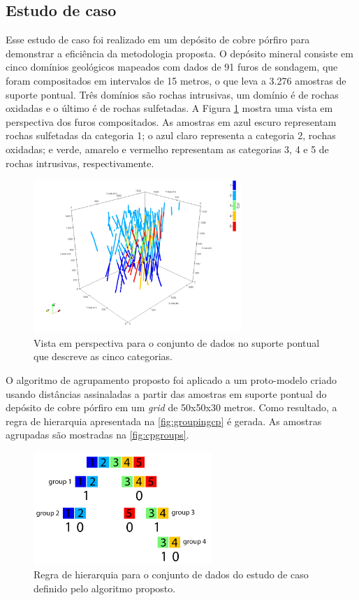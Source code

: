 \subsection{Estudo de caso}\label{estudo_cobre}

Esse estudo de caso foi realizado em um depósito de cobre pórfiro para demonstrar a eficiência da metodologia proposta. O depósito mineral consiste em cinco domínios geológicos mapeados com dados de 91 furos de sondagem, que foram compositados em intervalos de 15 metros, o que leva a 3.276 amostras de suporte pontual. Três domínios são rochas intrusivas, um domínio é de rochas oxidadas e o último é de rochas sulfetadas. A Figura \ref{fig:pointscp} mostra uma vista em perspectiva dos furos compositados. As amostras em azul escuro representam rochas sulfetadas da categoria 1; o azul claro representa a categoria 2, rochas oxidadas; e verde, amarelo e vermelho representam as categorias 3, 4 e 5 de rochas intrusivas, respectivamente.

\begin{figure}[H]
\centering
\caption{Vista em perspectiva para o conjunto de dados no suporte pontual que descreve as cinco categorias.}
\label{fig:pointscp}
\includegraphics[width=0.7\textwidth]{capitulo_3/imagens/pointscp.png}
\end{figure}

O algoritmo de agrupamento proposto foi aplicado a um proto-modelo criado usando distâncias assinaladas a partir das amostras em suporte pontual do depósito de cobre pórfiro em um \textit{grid} de 50x50x30 metros. Como resultado, a regra de hierarquia apresentada na \autoref{fig:groupingcp} é gerada. As amostras agrupadas são mostradas na \autoref{fig:cpgroups}.

\begin{figure}[H]
\caption{Regra de hierarquia para o conjunto de dados do estudo de caso definido pelo algoritmo proposto.}
\label{fig:groupingcp}
\centering
\includegraphics[width=0.6\textwidth]{capitulo_3/imagens/groupingcp.png}
\end{figure}

